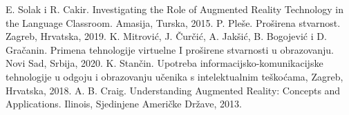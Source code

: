 \documentclass[a4paper]{article}
\begin{document}

        
        \begin{thebibliography}{9}
         E. Solak i R. Cakir. Investigating the Role of Augmented Reality Technology in the Language Classroom. Amasija, 
	Turska, 2015.
         P. Pleše. Proširena stvarnost. Zagreb, Hrvatska, 2019.
         K. Mitrović, J. Čurčić, A. Jakšić, B. Bogojević i D. Gračanin. Primena tehnologije virtuelne I proširene 
	stvarnosti u obrazovanju. Novi Sad, Srbija, 2020.
         K. Stančin. Upotreba informacijsko-komunikacijske tehnologije u odgoju i obrazovanju učenika s 
	intelektualnim teškoćama, Zagreb, Hrvatska, 2018.
         A. B. Craig. Understanding Augmented Reality: Concepts and Applications. Ilinois, Sjedinjene Američke 
	Države, 2013.
 
        \end{thebibliography}
\end{document}
